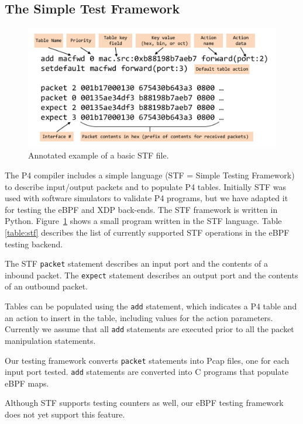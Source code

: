 \subsection{The Simple Test Framework}
\begin{figure}
  \centering
  \includegraphics[width=\linewidth]{stf}
  \caption{Annotated example of a basic STF file.}
  \label{fig:stf}
\end{figure}

The P4 compiler includes a simple language (STF = Simple Testing
Framework) to describe input/output packets and to populate P4 tables.
Initially STF was used with software simulators to validate P4
programs, but we have adapted it for testing the eBPF and XDP
back-ends.  The STF framework is written in Python.
Figure~\ref{fig:stf} shows a small program written in the STF
language.  Table \ref{table:stf} describes the list of currently
supported STF operations in the eBPF testing backend.

The STF \texttt{packet} statement describes an input port and the
contents of a inbound packet.  The \texttt{expect} statement describes
an output port and the contents of an outbound packet.

Tables can be populated using the \texttt{add} statement, which
indicates a P4 table and an action to insert in the table, including
values for the action parameters.  Currently we assume that all
\texttt{add} statements are executed prior to all the packet
manipulation statements.

Our testing framework converts \texttt{packet} statements into Pcap
files, one for each input port tested.  \texttt{add} statements are
converted into C programs that populate eBPF maps.

Although STF supports testing counters as well, our eBPF testing
framework does not yet support this feature.

